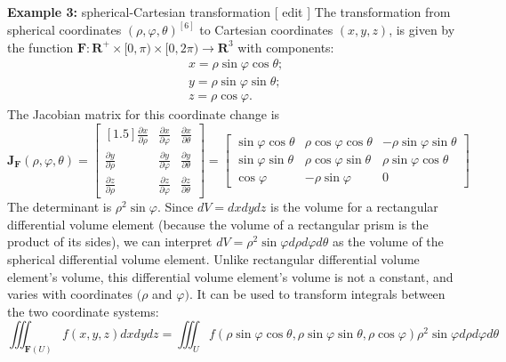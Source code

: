 \documentclass[13pt]{article}
\theoremstyle{definition}
\theoremstyle{remark}
\begin{document}
\textbf{Example 3:} spherical-Cartesian transformation [ edit ]
The transformation from spherical coordinates $(\rho, \varphi, \theta)^{[6]}$ to Cartesian coordinates $(x, y, z)$, is given by the function $\mathbf{F}: \mathbf{R}^{+} \times[0, \pi) \times[0,2 \pi) \rightarrow \mathbf{R}^3$ with components:
$$
\begin{aligned}
& x=\rho \sin \varphi \cos \theta ; \\
& y=\rho \sin \varphi \sin \theta ; \\
& z=\rho \cos \varphi .
\end{aligned}
$$
The Jacobian matrix for this coordinate change is
$$
\mathbf{J}_{\mathbf{F}}(\rho, \varphi, \theta)=\begin{bmatrix}[1.5]
\frac{\partial x}{\partial \rho} & \frac{\partial x}{\partial \varphi} & \frac{\partial x}{\partial \theta} \\
\frac{\partial y}{\partial \rho} & \frac{\partial y}{\partial \varphi} & \frac{\partial y}{\partial \theta} \\
\frac{\partial z}{\partial \rho} & \frac{\partial z}{\partial \varphi} & \frac{\partial z}{\partial \theta}
\end{bmatrix}=\left[\begin{array}{ccc}
\sin \varphi \cos \theta & \rho \cos \varphi \cos \theta & -\rho \sin \varphi \sin \theta \\
\sin \varphi \sin \theta & \rho \cos \varphi \sin \theta & \rho \sin \varphi \cos \theta \\
\cos \varphi & -\rho \sin \varphi & 0
\end{array}\right]
$$
The determinant is $\rho^2 \sin \varphi$. Since $d V=d x d y d z$ is the volume for a rectangular differential volume element (because the volume of a rectangular prism is the product of its sides), we can interpret $d V=\rho^2 \sin \varphi d \rho d \varphi d \theta$ as the volume of the spherical differential volume element. Unlike rectangular differential volume element's volume, this differential volume element's volume is not a constant, and varies with coordinates $(\rho$ and $\varphi)$. It can be used to transform integrals between the two coordinate systems:
$$
\iiint_{\mathbf{F}(U)} f(x, y, z) d x d y d z=\iiint_U f(\rho \sin \varphi \cos \theta, \rho \sin \varphi \sin \theta, \rho \cos \varphi) \rho^2 \sin \varphi d \rho d \varphi d \theta
$$
\end{document}

